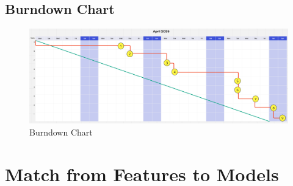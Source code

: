 \documentclass{article}
\begin{document}
\subsection*{Burndown Chart}

\begin{figure}[h]
  \centering
  \includegraphics[width=\textwidth]{images/burndown.png}
  \caption{Burndown Chart}
  \label{fig:burndown_chart}
\end{figure}

\clearpage

  


\section*{Match from Features to Models}
\end{document}
